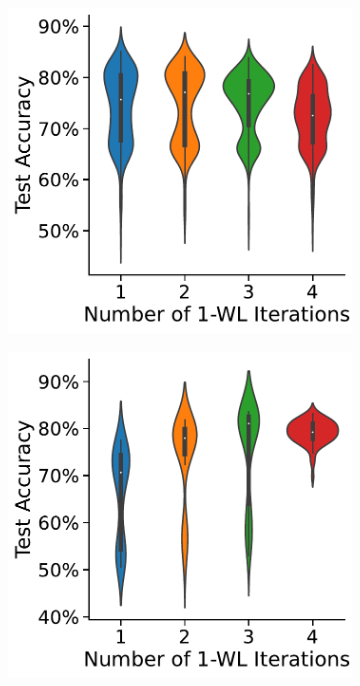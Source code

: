 \begin{figure}[thb]
\begin{subfigure}[b]{0.19\textwidth}
        \caption{\scriptsize\imdb}
	\end{subfigure}
	\hfill
	\begin{subfigure}[b]{0.19\textwidth}
		\centering
		\includegraphics[width=\textwidth]{Figures/k_wl_violin_MUTAG.pdf}
        \caption{\scriptsize\mutag}
	\end{subfigure}
	\hfill
	\begin{subfigure}[b]{0.19\textwidth}
		\centering
		\includegraphics[width=\textwidth]{Figures/k_wl_violin_NCI1.pdf}

\end{subfigure}
\end{figure}
